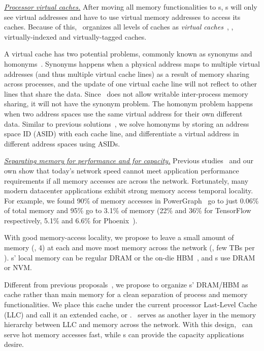 \textit{\uline{Processor virtual caches.}}
After moving all memory functionalities to \mcomponent{}s,  
\pcomponent{}s will only see virtual addresses and have to use virtual memory addresses to access its caches. 
Because of this, \lego\ organizes all levels of \pcomponent{} caches as {\em virtual caches}~\cite{Goodman-ASPLOS87,Wang-ISCA89},
\ie, virtually-indexed and virtually-tagged caches.

A virtual cache has two potential problems, commonly known as synonyms and homonyms~\cite{CacheMemory82}.
Synonyms happens when a physical address maps to multiple virtual addresses (and thus multiple virtual cache lines) 
as a result of memory sharing across processes,
and the update of one virtual cache line will not reflect to other lines that share the data.
Since \lego\ does not allow writable inter-process memory sharing,
it will not have the synonym problem.
The homonym problem happens when two address spaces use the same virtual address for their own different data.
Similar to previous solutions~\cite{OVC}, we solve homonyms by storing an address space ID (ASID) with each cache line,
and differentiate a virtual address in different address spaces using ASIDs.

\textit{\uline{Separating memory for performance and for capacity.}}
Previous studies~\cite{Gao16-OSDI,GU17-NSDI} and our own show that today's network speed 
cannot meet application performance requirements if all memory accesses are across the network. 
Fortunately, many modern datacenter applications exhibit strong memory access temporal locality.
For example, we found 90\% of memory accesses in PowerGraph~\cite{Gonzalez12-OSDI} go to just 0.06\% of total memory
and 95\% go to 3.1\% of memory
(22\% and 36\% for TensorFlow~\cite{TensorFlow} respectively,
5.1\% and 6.6\% for Phoenix~\cite{Ranger07-HPCA}).

With good memory-access locality, we propose to %
leave a small amount of memory (\eg, 4\GB) at each \pcomponent{}
and move most memory across the network (\eg, few TBs per \mcomponent{}).
\pcomponent{}s' local memory can be regular DRAM 
or the on-die HBM~\cite{HBM-JEDEC,Knights-Landing},
and \mcomponent{}s use DRAM or NVM.

Different from previous proposals~\cite{Lim09-disaggregate}, 
we propose to organize \pcomponent{}s' DRAM/HBM as cache rather than main memory
for a clean separation of process and memory functionalities.
We place this cache under the current processor Last-Level Cache (LLC)
and call it an extended cache, or {\em \excache}.
\excache\ serves as another layer in the memory hierarchy between LLC and memory across the network.
With this design, \excache\ can serve hot memory accesses fast, while \mcomponent{}s can provide the capacity applications desire. 

